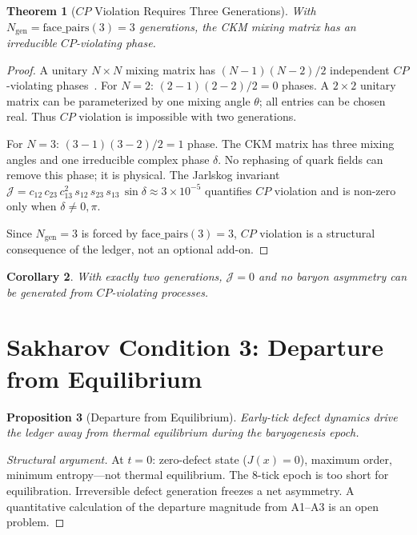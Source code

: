 \documentclass[12pt,a4paper]{article}
\newtheorem{theorem}{Theorem}[section]
\newtheorem{corollary}[theorem]{Corollary}
\newtheorem{proposition}[theorem]{Proposition}
\theoremstyle{definition}
\theoremstyle{remark}
\begin{document}
\begin{theorem}[$CP$ Violation Requires Three Generations]
\label{thm:cp-violation}
With $N_{\mathrm{gen}} = \mathrm{face\_pairs}(3) = 3$ generations,
the CKM mixing matrix has an irreducible $CP$-violating phase.
\end{theorem}

\begin{proof}
A unitary $N \times N$ mixing matrix has
$(N-1)(N-2)/2$ independent $CP$-violating phases~\cite{CKM}.  For
$N = 2$: $(2-1)(2-2)/2 = 0$ phases.  A $2 \times 2$ unitary matrix
can be parameterized by one mixing angle $\theta$; all entries can be
chosen real.  Thus $CP$ violation is impossible with two generations.

For $N = 3$: $(3-1)(3-2)/2 = 1$ phase.  The CKM matrix has three
mixing angles and one irreducible complex phase $\delta$.  No
rephasing of quark fields can remove this phase; it is physical.
The Jarlskog invariant
$\mathcal{J} = c_{12}\,c_{23}\,c_{13}^2\,s_{12}\,s_{23}\,s_{13}\,
\sin\delta \approx 3 \times 10^{-5}$ quantifies $CP$ violation
and is non-zero only when $\delta \neq 0,\pi$.

Since $N_{\mathrm{gen}} = 3$ is forced by
$\mathrm{face\_pairs}(3) = 3$, $CP$ violation is a structural
consequence of the ledger, not an optional add-on.
\end{proof}

\begin{corollary}
With exactly two generations, $\mathcal{J} = 0$ and no baryon
asymmetry can be generated from $CP$-violating processes.
\end{corollary}

\section{Sakharov Condition 3: Departure from Equilibrium}
\label{sec:out-of-eq}

\begin{proposition}[Departure from Equilibrium]
\label{thm:out-eq}
Early-tick defect dynamics drive the ledger away from thermal
equilibrium during the baryogenesis epoch.
\end{proposition}

\begin{proof}[Structural argument]
At $t = 0$: zero-defect state ($J(x) = 0$), maximum order, minimum
entropy---not thermal equilibrium.  The 8-tick epoch is too short for
equilibration.  Irreversible defect generation freezes a net asymmetry.
A quantitative calculation of the departure magnitude from A1--A3
is an open problem.
\end{proof}
\end{document}
